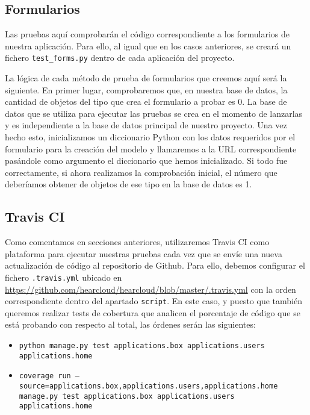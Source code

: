 \subsection{Formularios}

Las pruebas aquí comprobarán el código correspondiente a los formularios de nuestra aplicación. Para ello, al igual que en los casos anteriores, se creará un fichero \texttt{test\_forms.py} dentro de cada aplicación del proyecto.

La lógica de cada método de prueba de formularios que creemos aquí será la siguiente. En primer lugar, comprobaremos que, en nuestra base de datos, la cantidad de objetos del tipo que crea el formulario a probar es 0. La base de datos que se utiliza para ejecutar las pruebas se crea en el momento de lanzarlas y es independiente a la base de datos principal de nuestro proyecto. Una vez hecho esto, inicializamos un diccionario Python con los datos requeridos por el formulario para la creación del modelo y llamaremos a la URL correspondiente pasándole como argumento el diccionario que hemos inicializado. Si todo fue correctamente, si ahora realizamos la comprobación inicial, el número que deberíamos obtener de objetos de ese tipo en la base de datos es 1.

\subsection{Travis CI}

Como comentamos en secciones anteriores, utilizaremos Travis CI como plataforma para ejecutar nuestras pruebas cada vez que se envíe una nueva actualización de código al repositorio de Github. Para ello, debemos configurar el fichero \texttt{.travis.yml} ubicado en \url{https://github.com/hearcloud/hearcloud/blob/master/.travis.yml} con la orden correspondiente dentro del apartado \texttt{script}. En este caso, y puesto que también queremos realizar tests de cobertura \cite{Coveralls} que analicen el porcentaje de código que se está probando con respecto al total, las órdenes serán las siguientes:

\begin{itemize}
	\item \texttt{python manage.py test applications.box applications.users applications.home}
	\item \texttt{coverage run --source=applications.box,applications.users,applications.home manage.py test applications.box applications.users applications.home}
\end{itemize}

